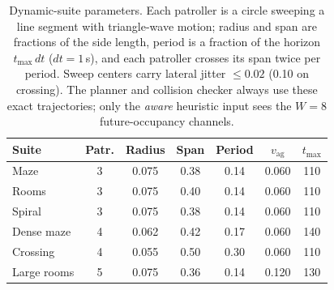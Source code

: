 \documentclass[letterpaper]{article} %
\begin{document}
\begin{table}[t]
\centering
\small
\setlength{\tabcolsep}{2.5pt}
\begin{tabular}{@{}lcccccc@{}}
\toprule
Suite & Patr. & Radius & Span & Period & $v_{\mathrm{ag}}$ & $t_{\max}$ \\
\midrule
Maze & 3 & 0.075 & 0.38 & 0.14 & 0.060 & 110 \\
Rooms & 3 & 0.075 & 0.40 & 0.14 & 0.060 & 110 \\
Spiral & 3 & 0.075 & 0.38 & 0.14 & 0.060 & 110 \\
Dense maze & 4 & 0.062 & 0.42 & 0.17 & 0.060 & 140 \\
Crossing & 4 & 0.055 & 0.50 & 0.30 & 0.060 & 110 \\
Large rooms & 5 & 0.075 & 0.36 & 0.14 & 0.120 & 130 \\
\bottomrule
\end{tabular}
\caption{Dynamic-suite parameters. Each patroller is a circle sweeping a line segment with triangle-wave motion; radius and span are fractions of the side length, period is a fraction of the horizon $t_{\max}\,dt$ ($dt{=}1$\,s), and each patroller crosses its span twice per period. Sweep centers carry lateral jitter $\leq 0.02$ (0.10 on crossing). The planner and collision checker always use these exact trajectories; only the \emph{aware} heuristic input sees the $W{=}8$ future-occupancy channels.}
\label{tab:dynspec}
\end{table}
\end{document}
